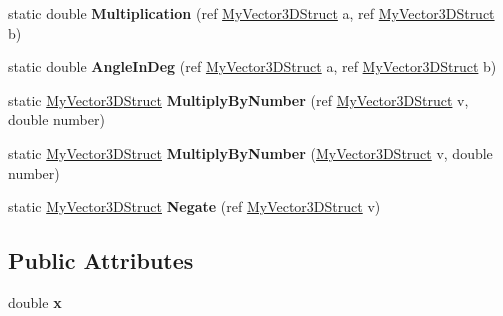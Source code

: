 \begin{DoxyCompactItemize}
static double {\bfseries Multiplication} (ref \mbox{\hyperlink{class_chess_tracking_1_1_utils_1_1_my_vector3_d_struct}{My\+Vector3\+D\+Struct}} a, ref \mbox{\hyperlink{class_chess_tracking_1_1_utils_1_1_my_vector3_d_struct}{My\+Vector3\+D\+Struct}} b)
\item 
\mbox{\label{class_chess_tracking_1_1_utils_1_1_my_vector3_d_struct_a127cd33ff035f6cb7f47b9f3bde7e02d}} 
static double {\bfseries Angle\+In\+Deg} (ref \mbox{\hyperlink{class_chess_tracking_1_1_utils_1_1_my_vector3_d_struct}{My\+Vector3\+D\+Struct}} a, ref \mbox{\hyperlink{class_chess_tracking_1_1_utils_1_1_my_vector3_d_struct}{My\+Vector3\+D\+Struct}} b)
\item 
\mbox{\label{class_chess_tracking_1_1_utils_1_1_my_vector3_d_struct_af1daa05c8a554e440723d8f5f91aa54d}} 
static \mbox{\hyperlink{class_chess_tracking_1_1_utils_1_1_my_vector3_d_struct}{My\+Vector3\+D\+Struct}} {\bfseries Multiply\+By\+Number} (ref \mbox{\hyperlink{class_chess_tracking_1_1_utils_1_1_my_vector3_d_struct}{My\+Vector3\+D\+Struct}} v, double number)
\item 
\mbox{\label{class_chess_tracking_1_1_utils_1_1_my_vector3_d_struct_af07cfe6d9f63b63b62e689e7700a9dcd}} 
static \mbox{\hyperlink{class_chess_tracking_1_1_utils_1_1_my_vector3_d_struct}{My\+Vector3\+D\+Struct}} {\bfseries Multiply\+By\+Number} (\mbox{\hyperlink{class_chess_tracking_1_1_utils_1_1_my_vector3_d_struct}{My\+Vector3\+D\+Struct}} v, double number)
\item 
\mbox{\label{class_chess_tracking_1_1_utils_1_1_my_vector3_d_struct_a3afea47fe5b43df1423804b359c93c59}} 
static \mbox{\hyperlink{class_chess_tracking_1_1_utils_1_1_my_vector3_d_struct}{My\+Vector3\+D\+Struct}} {\bfseries Negate} (ref \mbox{\hyperlink{class_chess_tracking_1_1_utils_1_1_my_vector3_d_struct}{My\+Vector3\+D\+Struct}} v)
\end{DoxyCompactItemize}
\subsection*{Public Attributes}
\begin{DoxyCompactItemize}
\item 
\mbox{\label{class_chess_tracking_1_1_utils_1_1_my_vector3_d_struct_a44798ca6bcd225bb4243b5d31e6550b6}} 
double {\bfseries x}
\end{DoxyCompactItemize}
